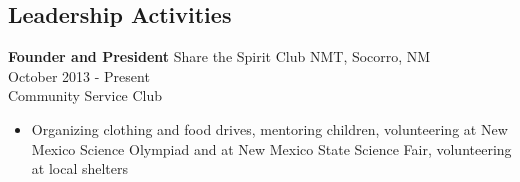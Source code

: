 \documentclass[margin]{res}
\begin{document}
\begin{resume}
\section{Leadership Activities} 
               {\bf Founder and President} Share the Spirit Club NMT, Socorro, NM \\
	 October 2013 - Present\\
	 Community Service Club
                \begin{itemize} \itemsep -2pt %
              \item Organizing clothing and food drives, mentoring children, volunteering at New Mexico Science Olympiad and at New Mexico State Science Fair, volunteering at local shelters
\end{itemize}




\end{resume} 
\end{document}
